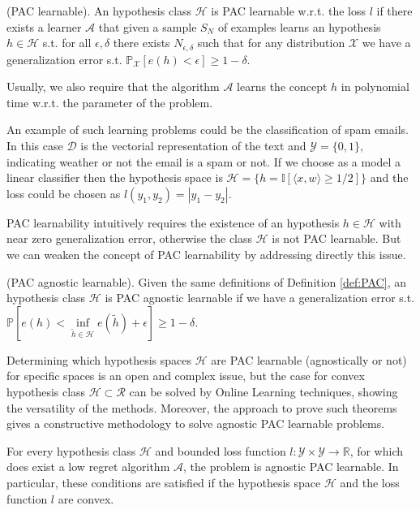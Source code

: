 \begin{definition}(PAC learnable).\label{def:PAC}
    An hypothesis class $\mathcal H$ is PAC learnable w.r.t. the loss $l$ if there exists a learner $\mathcal A$ that given a sample $S_N$ of examples learns an hypothesis $h\in\mathcal H$ s.t. for all $\epsilon,\delta$ there exists $N_{\epsilon,\delta}$ such that for any distribution $\mathcal X$ we have a generalization error s.t. $\mathbb P_\mathcal X\left[e(h)<\epsilon\right]\ge1-\delta$.
\end{definition}

Usually, we also require that the algorithm $\mathcal A$ learns the concept $h$ in polynomial time w.r.t. the parameter of the problem. 

An example of such learning problems could be the classification of spam emails. In this case $\mathcal D$ is the vectorial representation of the text and $\mathcal Y=\{0,1\}$, indicating weather or not the email is a spam or not. If we choose as a model a linear classifier then the hypothesis space is $\mathcal H=\{h = \mathbb I[\langle x,w\rangle \ge 1/2]\}$ and the loss could be chosen as $l(y_1,y_2)=|y_1-y_2|$.

PAC learnability intuitively requires the existence of an hypothesis $h\in\mathcal H$ with near zero generalization error, otherwise the class $\mathcal H$ is not PAC learnable.
But we can weaken the concept of PAC learnability by addressing directly this issue.

\begin{definition}(PAC agnostic learnable).
    Given the same definitions of Definition \ref{def:PAC}, an hypothesis class $\mathcal H$ is PAC agnostic learnable if we have a generalization error s.t. $\mathbb P\left[e(h)<\inf\limits_{\tilde h\in\mathcal H}e(\tilde h)+\epsilon\right]\ge1-\delta.$
\end{definition}

Determining which hypothesis spaces $\mathcal H$ are PAC learnable (agnostically or not) for specific spaces is an open and complex issue, but the case for convex hypothesis class $\mathcal H\subset\mathcal R$ can be solved by Online Learning techniques, showing the versatility of the methods. 
Moreover, the approach to prove such theorems gives a constructive methodology to solve agnostic PAC learnable problems.

\begin{theorem}
For every hypothesis class $\mathcal H$ and bounded loss function $l:\mathcal Y\times\mathcal Y\to \mathbb R$, for which does exist a low regret algorithm $\mathcal A$, the problem is agnostic PAC learnable. In particular, these conditions are satisfied if the hypothesis space $\mathcal H$ and the loss function $l$ are convex.
\end{theorem}

